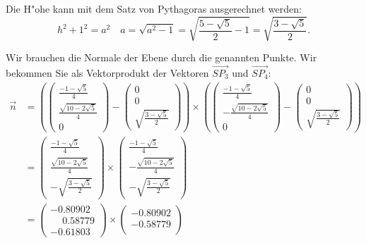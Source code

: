 \begin{loesung}
\begin{teilaufgaben}
\item Die H"ohe kann mit dem Satz von Pythagoras ausgerechnet werden:
\[
h^2+1^2=a^2\quad a=\sqrt{a^2-1}
=
\sqrt{\frac{5-\sqrt{5}}2-1}
=
\sqrt{\frac{3-\sqrt{5}}2}.
\]
\item
Wir brauchen die Normale der Ebene durch die genannten Punkte.
Wir bekommen Sie als Vektorprodukt der Vektoren
$\overrightarrow{SP_3}$
und
$\overrightarrow{SP_4}$:
\begin{align*}
\vec n
&=
\left(
\begin{pmatrix}
\frac{-1-\sqrt{5}}4\\
\frac{\sqrt{10-2\sqrt{5}}}4\\
0
\end{pmatrix}
-
\begin{pmatrix}
0\\0\\\sqrt{\frac{3-\sqrt{5}}2}
\end{pmatrix}
\right)
\times
\left(
\begin{pmatrix}
\frac{-1-\sqrt{5}}4\\
-\frac{\sqrt{10-2\sqrt{5}}}4\\
0
\end{pmatrix}
-
\begin{pmatrix}
0\\0\\\sqrt{\frac{3-\sqrt{5}}2}
\end{pmatrix}
\right)
\\
&=
\begin{pmatrix}
\frac{-1-\sqrt{5}}4\\
\frac{\sqrt{10-2\sqrt{5}}}4\\
-\sqrt{\frac{3-\sqrt{5}}2}
\end{pmatrix}
\times
\begin{pmatrix}
\frac{-1-\sqrt{5}}4\\
-\frac{\sqrt{10-2\sqrt{5}}}4\\
-\sqrt{\frac{3-\sqrt{5}}2}
\end{pmatrix}
\\
&=\begin{pmatrix}
  -0.80902\\
  \phantom{-}0.58779\\
  -0.61803   
\end{pmatrix}
\times
\begin{pmatrix}
  -0.80902\\
  -0.58779\\

\end{pmatrix}
\end{align*}
\end{teilaufgaben}
\end{loesung}
